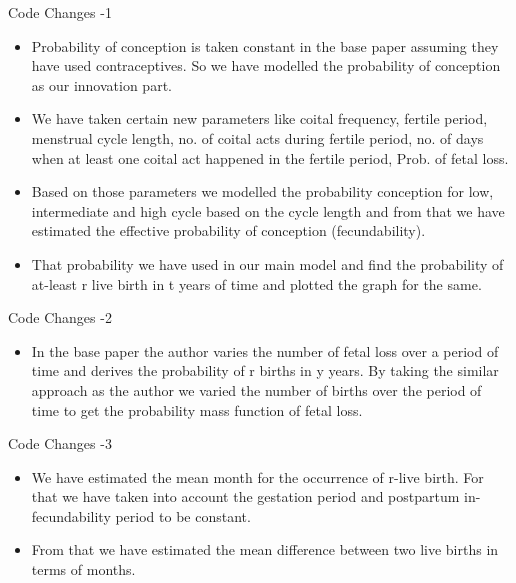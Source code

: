 \documentclass{article}
\begin{document}
    {\noindent \large Code Changes -1}
\begin{itemize} 
	\item Probability of conception is taken constant in the base paper assuming they have used contraceptives. So we have modelled the probability of conception as our innovation part. 
	\item We have taken certain new parameters like coital frequency, fertile period, menstrual cycle length, no. of coital acts during fertile period, no. of days when at least one coital act happened in the fertile period, Prob. of fetal loss.
	\item Based on those parameters we modelled the probability conception for low, intermediate and high cycle based on the cycle length and from that we have estimated the effective probability of conception (fecundability). 
	\item That probability we have used in our main model and find the probability of at-least r live birth in t years of time and plotted the graph for the same.	
\end{itemize}
{\large Code Changes -2}
\begin{itemize}
	\item In the base paper the author varies the number of fetal loss over a period of time and derives the probability of r births in y years. By taking the similar approach as the author we varied the number of births over the period of time to get the probability mass function of fetal loss.
\end{itemize}
{\large Code Changes -3}
\begin{itemize}
	\item We have estimated the mean month for the occurrence of r-live birth. For that we have taken into account the gestation period and   postpartum in-fecundability period to be constant.
	\item From that we have estimated the mean difference between two live births in terms of months. 
\end{itemize}
\end{document}
